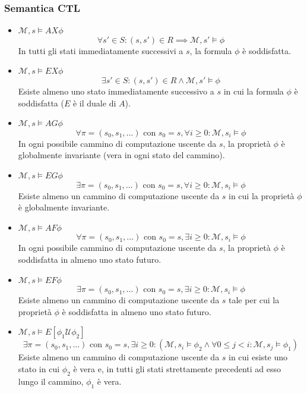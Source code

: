 \documentclass{article}
\begin{document}
\subsubsection*{Semantica CTL}
\begin{itemize}
    \item \textbf{$\mathcal{M}, s \models AX\phi$}
    \[
    \forall s' \in S : (s, s') \in R \implies \mathcal{M}, s' \models \phi
    \]
    In tutti gli stati immediatamente successivi a $s$, la formula $\phi$ è soddisfatta.
    
    \item \textbf{$\mathcal{M}, s \models EX\phi$}
    \[
    \exists s' \in S : (s, s') \in R \land \mathcal{M}, s' \models \phi
    \]
    Esiste almeno uno stato immediatamente successivo a $s$ in cui la formula $\phi$ è soddisfatta ($E$ è il duale di $A$).
    
    \item \textbf{$\mathcal{M}, s \models AG\phi$}
    \[
    \forall \pi = (s_0, s_1, \dots) \text{ con } s_0 = s, \forall i \ge 0 : \mathcal{M}, s_i \models \phi
    \]
    In ogni possibile cammino di computazione uscente da $s$, la proprietà $\phi$ è globalmente invariante (vera in ogni stato del cammino).
    
    \item \textbf{$\mathcal{M}, s \models EG\phi$}
    \[
    \exists \pi = (s_0, s_1, \dots) \text{ con } s_0 = s, \forall i \ge 0 : \mathcal{M}, s_i \models \phi
    \]
    Esiste almeno un cammino di computazione uscente da $s$ in cui la proprietà $\phi$ è globalmente invariante.
    
    \item \textbf{$\mathcal{M}, s \models AF\phi$}
    \[
    \forall \pi = (s_0, s_1, \dots) \text{ con } s_0 = s, \exists i \ge 0 : \mathcal{M}, s_i \models \phi
    \]
    In ogni possibile cammino di computazione uscente da $s$, la proprietà $\phi$ è soddisfatta in almeno uno stato futuro.
    
    \item \textbf{$\mathcal{M}, s \models EF\phi$}
    \[
    \exists \pi = (s_0, s_1, \dots) \text{ con } s_0 = s, \exists i \ge 0 : \mathcal{M}, s_i \models \phi
    \]
    Esiste almeno un cammino di computazione uscente da $s$ tale per cui la proprietà $\phi$ è soddisfatta in almeno uno stato futuro.
    
    \item \textbf{$\mathcal{M}, s \models E[\phi_1 \mathcal{U} \phi_2]$}
    \[
    \exists \pi = (s_0, s_1, \dots) \text{ con } s_0 = s, \exists i \ge 0 : \left( \mathcal{M}, s_i \models \phi_2 \land \forall 0 \le j < i : \mathcal{M}, s_j \models \phi_1 \right)
    \]
    Esiste almeno un cammino di computazione uscente da $s$ in cui esiste uno stato in cui $\phi_2$ è vera e, in tutti gli stati strettamente precedenti ad esso lungo il cammino, $\phi_1$ è vera.
\end{itemize}
\end{document}
